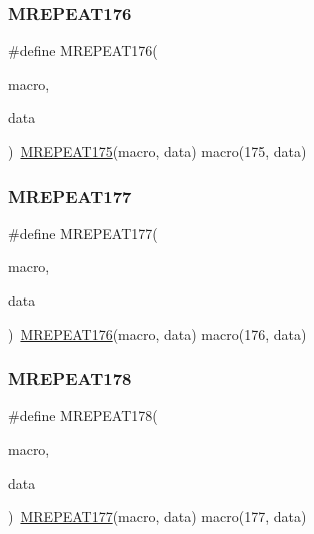 \mbox{\label{group__group__sam0__utils__mrepeat_gabc62b219e91e0d7826b32e29b7dd3834}} 
\subsubsection{\texorpdfstring{MREPEAT176}{MREPEAT176}}
{\footnotesize\ttfamily \#define M\+R\+E\+P\+E\+A\+T176(\begin{DoxyParamCaption}\item[{}]{macro,  }\item[{}]{data }\end{DoxyParamCaption})~\mbox{\hyperlink{group__group__sam0__utils__mrepeat_gaaad2bc103b928f34a3dc0a556f252b02}{M\+R\+E\+P\+E\+A\+T175}}(macro, data)   macro(175, data)}

\mbox{\label{group__group__sam0__utils__mrepeat_ga002048f3987041ffb748ab027b75d2cb}} 
\subsubsection{\texorpdfstring{MREPEAT177}{MREPEAT177}}
{\footnotesize\ttfamily \#define M\+R\+E\+P\+E\+A\+T177(\begin{DoxyParamCaption}\item[{}]{macro,  }\item[{}]{data }\end{DoxyParamCaption})~\mbox{\hyperlink{group__group__sam0__utils__mrepeat_gabc62b219e91e0d7826b32e29b7dd3834}{M\+R\+E\+P\+E\+A\+T176}}(macro, data)   macro(176, data)}

\mbox{\label{group__group__sam0__utils__mrepeat_gaba5fc88c5803e8272ce412fea9e908a3}} 
\subsubsection{\texorpdfstring{MREPEAT178}{MREPEAT178}}
{\footnotesize\ttfamily \#define M\+R\+E\+P\+E\+A\+T178(\begin{DoxyParamCaption}\item[{}]{macro,  }\item[{}]{data }\end{DoxyParamCaption})~\mbox{\hyperlink{group__group__sam0__utils__mrepeat_ga002048f3987041ffb748ab027b75d2cb}{M\+R\+E\+P\+E\+A\+T177}}(macro, data)   macro(177, data)}

